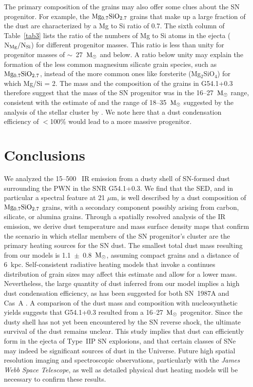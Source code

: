 \documentclass{emulateapj}
\begin{document}
The primary composition of the grains may also offer some clues about the SN progenitor. For example, the $\rm Mg_{0.7}SiO_{2.7}$ grains that make up a large fraction of the dust are characterized by a Mg to Si ratio of 0.7. The sixth column of Table~\ref{tab3} lists the ratio of the numbers of Mg to Si atoms in the ejecta ($\rm N_{Mg}/N_{Si}$) for different progenitor masses. This ratio is less than unity for progenitor masses of $\sim$~27~$\rm M_{\odot}$ and below. A ratio below unity may explain the formation of the less common magnesium silicate grain species, such as $\rm Mg_{0.7}SiO_{2.7}$, instead of the more common ones like forsterite (Mg$_2$SiO$_4$) for which Mg/Si = 2. The mass and the composition of the grains in G54.1+0.3 therefore suggest that the mass of the SN progenitor was in the 16--27~$\rm M_{\odot}$ range, consistent with the estimate of \citet{gelfand15} and the range of 18--35~$\rm M_{\odot}$ suggested by the analysis of the stellar cluster by \citet{kim13}. We note here that a dust condensation efficiency of $<$100\% would lead to a more massive progenitor.


\section{Conclusions}\label{conclusions}

We analyzed the 15--500 \micron\ IR emission from a dusty shell of SN-formed dust surrounding the PWN in the SNR G54.1+0.3. We find that the SED, and in particular a spectral feature at 21 $\mu$m, is well described by a dust composition of $\rm Mg_{0.7}SiO_{2.7}$ grains, with a secondary component possibly arising from carbon, silicate, or alumina grains. Through a spatially resolved analysis of the IR emission, we derive dust temperature and mass surface density maps that confirm the scenario in which stellar members of the SN progenitor's cluster are the primary heating sources for the SN dust. The smallest total dust mass resulting from our models is 1.1~$\pm$~0.8~$\rm M_{\odot}$, assuming compact grains and a distance of 6~kpc. Self-consistent radiative heating models that invoke a continues distribution of grain sizes may affect this estimate and allow for a lower mass.
Nevertheless, the large quantity of dust inferred from our model implies a high dust condensation efficiency, as has been suggested for both SN~1987A and Cas~A \citep{matsuura15, dwek15,micelotta16}. A comparison of the dust mass and composition with nucleosynthetic yields suggests that G54.1+0.3 resulted from a 16--27~$\rm M_{\odot}$ progenitor. Since the dusty shell has not yet been encountered by the SN reverse shock, the ultimate survival of the dust remains unclear. This study implies that dust can efficiently form in the ejecta of Type~IIP SN explosions, and that certain classes of SNe may indeed be significant sources of dust in the Universe. Future high spatial resolution imaging and spectroscopic observations, particularly with the \textit{James Webb Space Telescope}, as well as detailed physical dust heating models will be necessary to confirm these results.
\end{document}
